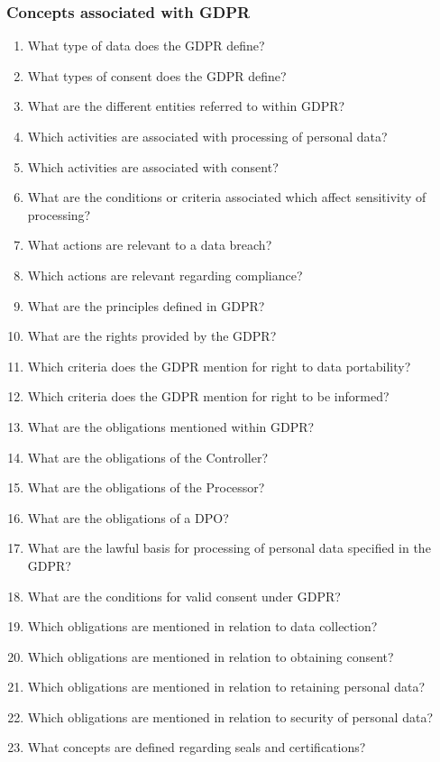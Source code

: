 \subsubsection{Concepts associated with GDPR}
\begin{enumerate}[label={\texttt{CQ.\theenumi}},resume]
    \item What type of data does the GDPR define?
    \item What types of consent does the GDPR define?
    \item What are the different entities referred to within GDPR?
    \item Which activities are associated with processing of personal data?
    \item Which activities are associated with consent?
    \item What are the conditions or criteria associated which affect sensitivity of processing?
    \item What actions are relevant to a data breach?
    \item Which actions are relevant regarding compliance?
    \item What are the principles defined in GDPR?
    \item What are the rights provided by the GDPR?
    \item Which criteria does the GDPR mention for right to data portability?
    \item Which criteria does the GDPR mention for right to be informed?
    \item What are the obligations mentioned within GDPR?
    \item What are the obligations of the Controller?
    \item What are the obligations of the Processor?
    \item What are the obligations of a DPO?
    \item What are the lawful basis for processing of personal data specified in the GDPR?
    \item What are the conditions for valid consent under GDPR?
    \item Which obligations are mentioned in relation to data collection?
    \item Which obligations are mentioned in relation to obtaining consent?
    \item Which obligations are mentioned in relation to retaining personal data?
    \item Which obligations are mentioned in relation to security of personal data?
    \item What concepts are defined regarding seals and certifications?
\end{enumerate}

